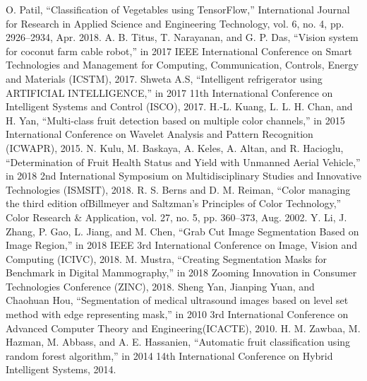 \documentclass[conference]{IEEEtran}
\begin{document}
\begin{thebibliography}{00}
		 O. Patil, ``Classification of Vegetables using TensorFlow,'' International Journal for Research in Applied Science and Engineering Technology, vol. 6, no. 4, pp. 2926–2934, Apr. 2018.
		 A. B. Titus, T. Narayanan, and G. P. Das, ``Vision system for coconut farm cable robot,'' in 2017 IEEE International Conference on Smart Technologies and Management for Computing, Communication, Controls, Energy and Materials (ICSTM), 2017.
		 Shweta A.S, ``Intelligent refrigerator using ARTIFICIAL INTELLIGENCE,'' in 2017 11th International Conference on Intelligent Systems and Control (ISCO), 2017.
		 H.-L. Kuang, L. L. H. Chan, and H. Yan, ``Multi-class fruit detection based on multiple color channels,'' in 2015 International Conference on Wavelet Analysis and Pattern Recognition (ICWAPR), 2015.
		 N. Kulu, M. Baskaya, A. Keles, A. Altan, and R. Hacioglu, ``Determination of Fruit Health Status and Yield with Unmanned Aerial Vehicle,'' in 2018 2nd International Symposium on Multidisciplinary Studies and Innovative Technologies (ISMSIT), 2018.
		 R. S. Berns and D. M. Reiman, ``Color managing the third edition ofBillmeyer and Saltzman’s Principles of Color Technology,'' Color Research \& Application, vol. 27, no. 5, pp. 360–373, Aug. 2002.
		 Y. Li, J. Zhang, P. Gao, L. Jiang, and M. Chen, ``Grab Cut Image Segmentation Based on Image Region,'' in 2018 IEEE 3rd International Conference on Image, Vision and Computing (ICIVC), 2018.
		 M. Mustra, ``Creating Segmentation Masks for Benchmark in Digital Mammography,'' in 2018 Zooming Innovation in Consumer Technologies Conference (ZINC), 2018.
		 Sheng Yan, Jianping Yuan, and Chaohuan Hou, ``Segmentation of medical ultrasound images based on level set method with edge representing mask,'' in 2010 3rd International Conference on Advanced Computer Theory and Engineering(ICACTE), 2010.
		 H. M. Zawbaa, M. Hazman, M. Abbass, and A. E. Hassanien, ``Automatic fruit classification using random forest algorithm,'' in 2014 14th International Conference on Hybrid Intelligent Systems, 2014.
	\end{thebibliography}
\end{document}
